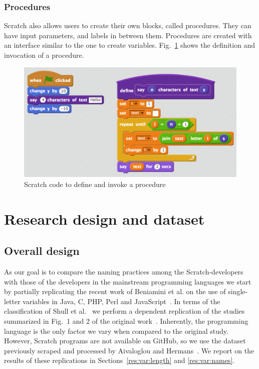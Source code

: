 \documentclass[conference]{IEEEtran}
\begin{document}
\subsubsection{Procedures} \label {sec:Scratch_func}
Scratch also allows users to create their own blocks, called procedures. They can have input parameters, and labels in between them. Procedures are created with an interface similar to the one to create variables. Fig.~\ref{fig:procedures} shows the definition and invocation of a procedure.

\begin{figure}
  \begin{center}
  \includegraphics[width=\columnwidth]{fig/procedures2.png}
  \caption{Scratch code to define and invoke a procedure}
  \label{fig:procedures}
  \end{center}
\end{figure} 


\section{Research design and dataset}
\subsection{Overall design}
As our goal is to compare the naming practices among the Scratch-developers with those of the developers in the mainstream programming languages we start by partially replicating the recent work of Beniamini et al. on the use of single-letter variables in Java, C, PHP, Perl and JavaScript~\cite{Beniamini}. 
In terms of the classification of Shull et al.~\cite{Shull2008} we perform a dependent replication of the studies summarized in Fig.~1 and 2 of the original work~\cite{Beniamini}.  
Inherently, the programming language is the only factor we vary when compared to the original study. 
However, Scratch programs are not available on GitHub, so we use the dataset previously scraped and processed by Aivaloglou and Hermans~\cite{Aivaloglou2016HowKC}. 
We report on the results of these replications in Sections~\ref{res:var:length} and \ref{res:var:names}.
\end{document}
